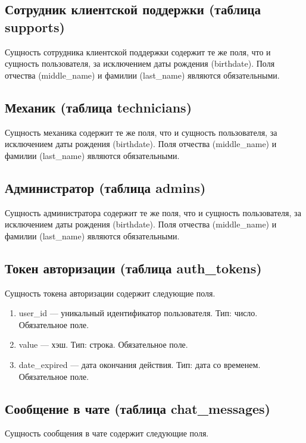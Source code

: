 \subsection{Сотрудник клиентской поддержки (таблица supports)}

Сущность сотрудника клиентской поддержки содержит те же поля, что и сущность пользователя, за исключением даты рождения (birthdate). Поля отчества (middle\_name) и фамилии (last\_name) являются обязательными.

\subsection{Механик (таблица technicians)}

Сущность механика содержит те же поля, что и сущность пользователя, за исключением даты рождения (birthdate). Поля отчества (middle\_name) и фамилии (last\_name) являются обязательными.

\subsection{Администратор (таблица admins)}

Сущность администратора содержит те же поля, что и сущность пользователя, за исключением даты рождения (birthdate). Поля отчества (middle\_name) и фамилии (last\_name) являются обязательными.

\subsection{Токен авторизации (таблица auth\_tokens)}

Сущность токена авторизации содержит следующие поля.

\begin{enumerate}
    \item user\_id --- уникальный идентификатор пользователя. Тип: число. Обязательное поле.
    \item value --- хэш. Тип: строка. Обязательное поле.
    \item date\_expired --- дата окончания действия. Тип: дата со временем. Обязательное поле.
\end{enumerate}

\subsection{Сообщение в чате (таблица chat\_messages)}

Сущность сообщения в чате содержит следующие поля.

